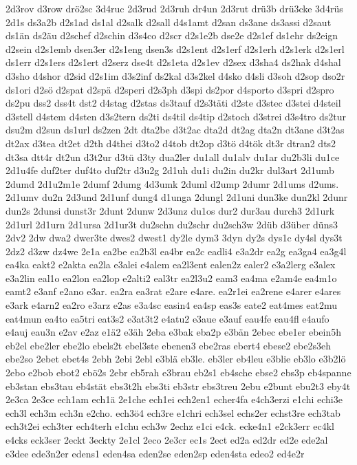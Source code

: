 {2d3rov
d3row
drö2sc
3d4ruc
2d3rud
2d3ruh
dr4un
2d3rut
drü3b
drü3cke
3d4rüs
2d1s
ds3a2b
d2s1ad
ds1al
d2salk
d2sall
d4s1amt
d2san
ds3ane
ds3assi
d2saut
ds1än
ds2äu
d2schef
d2schin
d3s4co
d2scr
d2s1e2b
dse2e
d2s1ef
ds1ehr
ds2eign
d2sein
d2s1emb
dsen3er
d2s1eng
dsen3s
d2s1ent
d2s1erf
d2s1erh
d2s1erk
d2s1erl
ds1err
d2s1ers
d2s1ert
d2serz
dse4t
d2s1eta
d2s1ev
d2sex
d3sha4
ds2hak
d4shal
d3sho
d4shor
d2sid
d2s1im
d3s2inf
ds2kal
d3s2kel
d4sko
d4sli
d3soh
d2sop
dso2r
ds1ori
d2sö
d2spat
d2spä
d2speri
d2s3ph
d3spi
ds2por
d4sporto
d3spri
d2spro
ds2pu
dss2
dss4t
dst2
d4stag
d2stas
ds3tauf
d2s3täti
d2ste
d3stec
d3stei
d4steil
d3stell
d4stem
d4sten
d3s2tern
ds2ti
ds4til
ds4tip
d2stoch
d3strei
d3s4tro
ds2tur
dsu2m
d2sun
ds1url
ds2zen
2dt
dta2be
d3t2ac
dta2d
dt2ag
dta2n
dt3ane
d3t2as
dt2ax
d3tea
dt2et
d2th
d4thei
d3to2
d4tob
dt2op
d3tö
d4tök
dt3r
dtran2
dts2
dt3sa
dtt4r
dt2un
d3t2ur
d3tü
d3ty
dua2ler
du1all
du1alv
du1ar
du2b3li
du1ce
2d1u4fe
duf2ter
duf4to
duf2tr
d3u2g
2d1uh
du1i
du2in
du2kr
dul3art
2d1umb
2dumd
2d1u2m1e
2dumf
2dumg
4d3umk
2duml
d2ump
2dumr
2d1ums
d2ums.
2d1umv
du2n
2d3und
2d1unf
dung4
d1unga
2dungl
2d1uni
dun3ke
dun2kl
2dunr
dun2s
2dunsi
dunst3r
2dunt
2dunw
2d3unz
du1os
dur2
dur3au
durch3
2d1urk
2d1url
2d1urn
2d1ursa
2d1ur3t
du2schn
du2schr
du2sch3w
2düb
d3über
düns3
2dv2
2dw
dwa2
dwer3te
dwes2
dwest1
dy2le
dym3
3dyn
dy2s
dys1c
dy4sl
dys3t
2dz2
d3zw
dz4we
2e1a
ea2be
ea2b3l
ea4br
ea2c
eadli4
e3a2dr
ea2g
ea3ga4
ea3g4l
ea4ka
eakt2
e2akta
ea2la
e3alei
e4alem
ea2l3ent
ealen2z
ealer2
e3a2lerg
e3alex
e3a2lin
eal1o
ea2lon
ea2lop
e2alti2
eal3tr
ea2l3u2
eam3
ea4ma
e2am4e
ea4m1o
eamt2
e3anf
e2ano
e3ar.
ea2ra
ea3rat
e2are
e4are.
ea2r1ei
ea2rene
e4arer
e4ares
e3ark
e4arn2
ea2ro
e3arz
e2as
e3a4sc
easin4
ea4sp
eas3s
eate2
eat4mes
eat2mu
eat4mun
ea4to
ea5tri
eat3s2
e3at3t2
e4atu2
e3aue
e3auf
eau4fe
eau4fl
e4aufo
e4auj
eau3n
e2av
e2az
e1ä2
e3äh
2eba
e3bak
eba2p
e3bän
2ebec
ebe1er
ebein5h
eb2el
ebe2ler
ebe2lo
ebels2t
ebel3ste
ebenen3
ebe2ras
ebert4
ebese2
ebe2s3eh
ebe2so
2ebet
ebet4s
2ebh
2ebi
2ebl
e3blä
eb3le.
eb3ler
eb4leu
e3blie
eb3lo
e3b2lö
2ebo
e2bob
ebot2
ebö2s
2ebr
eb5rah
e3brau
eb2s1
eb4sche
ebse2
ebs3p
eb4spanne
eb3stan
ebs3tau
eb4stät
ebs3t2h
ebs3ti
eb3str
ebs3treu
2ebu
e2bunt
ebu2t3
eby4t
2e3ca
2e3ce
ech1am
ech1ä
2e1che
ech1ei
ech2en1
echer4fa
e4ch3erzi
e1chi
echi3e
ech3l
ech3m
ech3n
e2cho.
ech3ö4
ech3re
e1chri
ech3sel
echs2er
echst3re
ech3tab
ech3t2ei
ech3ter
ech4terh
e1chu
ech3w
2echz
e1ci
e4ck.
ecke4n1
e2ck3err
ec4kl
e4cks
eck3ser
2eckt
3eckty
2e1cl
2eco
2e3cr
ec1s
2ect
ed2a
ed2dr
ed2e
ede2al
e3dee
ede3n2er
edens1
eden4sa
eden2se
eden2sp
eden4sta
edeo2
ed4e2r
}
